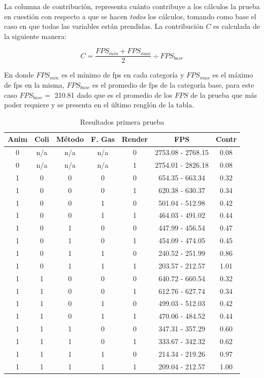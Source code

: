 La columna de contribución, representa cuánto contribuye a los cálculos la prueba en cuestión con respecto a que se hacen \emph{todos} los cálculos, tomando como base el caso en que todas las variables están prendidas. La contribución $C$ es calculada de la siguiente manera:

$$ C = \frac{FPS_{min} + FPS_{max}}{2} \div FPS_{base}$$

En donde $FPS_{min}$ es el mínimo de fps en cada categoría y $FPS_{max}$ es el máximo de fps en la misma, $FPS_{base}$ es el promedio de fps de la categoría base, para este caso $FPS_{base} =$ 210.81 dado que es el promedio de los $FPS$ de la prueba que más poder requiere y se presenta en el último renglón de la tabla.

\begin{table}
\caption[Resultados de la prueba del programa]{Resultados primera prueba}
\label{resultado:prueba1}
\begin{center}
\begin{tabular} {|c|c|c|c|c|c|c|} \hline
 Anim & Coli & Método & F. Gas & Render & FPS & Contr\\ \hline
 0 & n/a & n/a & n/a & 0 & 2753.08 - 2768.15 & 0.08\\
 0 & n/a & n/a & n/a & 1 & 2754.01 - 2826.18 & 0.08\\
 1 & 0 & 0 & 0 & 0 & 654.35 - 663.34 & 0.32\\
 1 & 0 & 0 & 0 & 1 & 620.38 - 630.37 & 0.34\\
 1 & 0 & 0 & 1 & 0 & 501.04 - 512.98 & 0.42\\
 1 & 0 & 0 & 1 & 1 & 464.03 - 491.02 & 0.44\\
 1 & 0 & 1 & 0 & 0 & 447.99 - 456.54 & 0.47\\
 1 & 0 & 1 & 0 & 1 & 454.09 - 474.05 & 0.45\\
 1 & 0 & 1 & 1 & 0 & 240.52 - 251.99 & 0.86\\
 1 & 0 & 1 & 1 & 1 & 203.57 - 212.57 & 1.01\\
 1 & 1 & 0 & 0 & 0 & 640.72 - 660.54 & 0.32\\
 1 & 1 & 0 & 0 & 1 & 612.76 - 627.74 & 0.34\\
 1 & 1 & 0 & 1 & 0 & 499.03 - 512.03 & 0.42\\
 1 & 1 & 0 & 1 & 1 & 470.06 - 484.52 & 0.44\\
 1 & 1 & 1 & 0 & 0 & 347.31 - 357.29 & 0.60\\
 1 & 1 & 1 & 0 & 1 & 333.67 - 342.32 & 0.62\\
 1 & 1 & 1 & 1 & 0 & 214.34 - 219.26 & 0.97\\
 1 & 1 & 1 & 1 & 1 & 209.04 - 212.57 & 1.00\\
\hline
\end{tabular}
\end{center}
\end{table}

